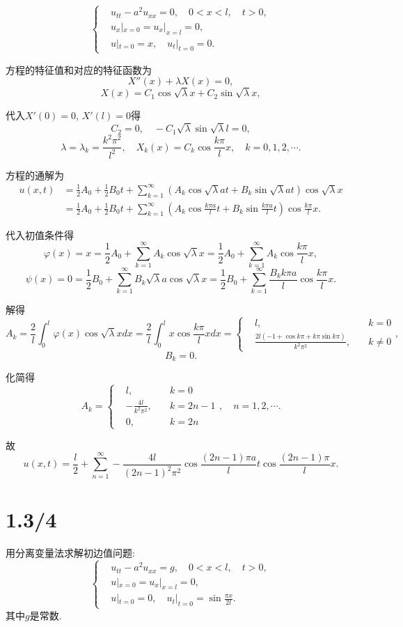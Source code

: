 \documentclass[11pt,a4paper]{article}
\begin{document}
$$
  \left\{\begin{aligned}
     & u_{tt}-a^2u_{xx}=0, \quad 0<x<l,\quad t>0, \\
     & u_x|_{x=0}=u_x|_{x=l}=0,                   \\
     & u|_{t=0}=x,\quad u_t|_{t=0}=0.
  \end{aligned}\right.
$$

方程的特征值和对应的特征函数为
$$X''(x)+\lambda X(x)=0,$$
$$X(x)=C_1\cos\sqrt{\lambda}x+C_2\sin\sqrt{\lambda}x,$$

代入$X'(0)=0$, $X'(l)=0$得
$$C_2=0,\quad -C_1\sqrt{\lambda}\sin\sqrt{\lambda}l=0,$$
$$\lambda=\lambda_k=\frac{k^2\pi^2}{l^2},\quad X_k(x)=C_k\cos\frac{k\pi}{l}x,\quad k=0,1,2,\cdots.$$

方程的通解为
\begin{align*}
  u(x,t)
   & =\frac{1}{2}A_0+\frac{1}{2}B_0t+
  \sum_{k=1}^\infty\left(A_k\cos\sqrt{\lambda}at+
  B_k\sin\sqrt{\lambda}at\right)\cos\sqrt{\lambda}x \\
   & =\frac{1}{2}A_0+\frac{1}{2}B_0t+
  \sum_{k=1}^\infty\left(A_k\cos\frac{k\pi a}{l}t+
  B_k\sin\frac{k\pi a}{l}t\right)\cos\frac{k\pi}{l}x.
\end{align*}

代入初值条件得
$$\varphi(x)=x=\frac{1}{2}A_0+\sum_{k=1}^\infty A_k\cos\sqrt{\lambda}x=\frac{1}{2}A_0+\sum_{k=1}^\infty A_k\cos\frac{k\pi }{l}x,$$
$$\psi(x)=0=\frac{1}{2}B_0+\sum_{k=1}^\infty B_k\sqrt{\lambda}a\cos\sqrt{\lambda}x=\frac{1}{2}B_0+\sum_{k=1}^\infty \frac{B_kk\pi a}{l}\cos\frac{k\pi}{l}x.$$

解得
$$A_k=\frac{2}{l}\int_0^l\varphi(x)\cos\sqrt{\lambda}xdx=\frac{2}{l}\int_0^lx\cos\frac{k\pi}{l}xdx=\left\{\begin{aligned}&l,&\quad k=0\\&\frac{2l(-1+\cos k\pi+k\pi\sin k\pi)}{k^2\pi^2},&\quad k\neq 0\end{aligned}\right.,$$
$$B_k=0.$$

化简得
$$A_k=\left\{\begin{aligned}&l,&\quad k=0\\&-\frac{4l}{k^2\pi^2}, &\quad k = 2n-1 \\ &0, &\quad k=2n \end{aligned}\right.,\quad n=1,2,\cdots.$$

故
$$u(x,t)=\frac{l}{2}+\sum_{n=1}^\infty-\frac{4l}{(2n-1)^2\pi^2}\cos\frac{(2n-1)\pi a}{l}t\cos\frac{(2n-1)\pi}{l}x.$$

\section{1.3/4}
\begin{problem}
用分离变量法求解初边值问题:
$$
  \left\{\begin{aligned}
     & u_{tt}-a^2u_{xx}=g, \quad 0<x<l,\quad t>0,        \\
     & u|_{x=0}=u_x|_{x=l}=0,                            \\
     & u|_{t=0}=0,\quad u_t|_{t=0}=\sin\frac{\pi x}{2l}.
  \end{aligned}\right.
$$
其中$g$是常数.
\end{problem}
\end{document}
